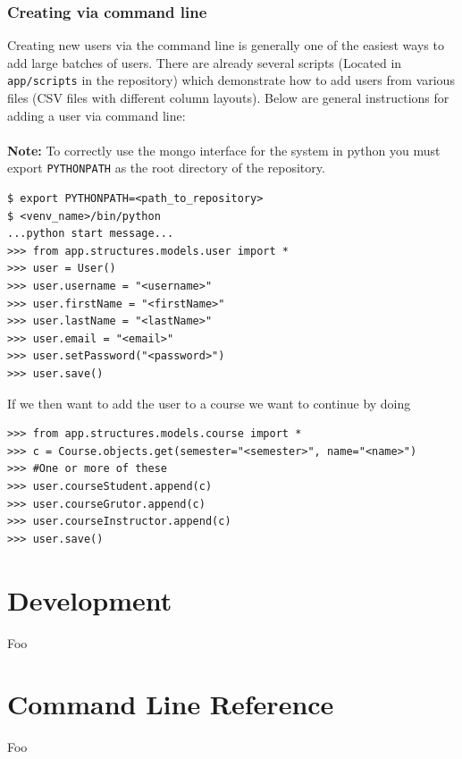 \documentclass[11pt]{report}
\begin{document}
\subsection{Creating via command line}
Creating new users via the command line is generally one of the easiest ways to add large batches of users. 
There are already several scripts (Located in \verb|app/scripts| in the repository) which demonstrate how to 
add users from various files (CSV files with different column layouts). Below are general instructions for adding
a user via command line:
\\
\\
\noindent\textbf{Note:} To correctly use the mongo interface for the system in python you must export \verb|PYTHONPATH| as the root directory of the repository.

\begin{verbatim}
$ export PYTHONPATH=<path_to_repository>
$ <venv_name>/bin/python
...python start message...
>>> from app.structures.models.user import *
>>> user = User()
>>> user.username = "<username>"
>>> user.firstName = "<firstName>"
>>> user.lastName = "<lastName>"
>>> user.email = "<email>"
>>> user.setPassword("<password>")
>>> user.save()
\end{verbatim}

\noindent If we then want to add the user to a course we want to continue by doing

\begin{verbatim}
>>> from app.structures.models.course import *
>>> c = Course.objects.get(semester="<semester>", name="<name>")
>>> #One or more of these
>>> user.courseStudent.append(c)
>>> user.courseGrutor.append(c)
>>> user.courseInstructor.append(c)
>>> user.save()
\end{verbatim}




\chapter{Development}
\label{ch:develop}
Foo

\chapter{Command Line Reference}
Foo
\end{document}
